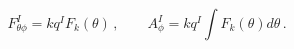 \begin{equation}
F^I_{\theta\phi} = k q^I F_k(\theta)\,, \qquad
A^I_{\phi} = k q^I \int F_k(\theta) d\theta\,. \label{magnfields}
\end{equation}

